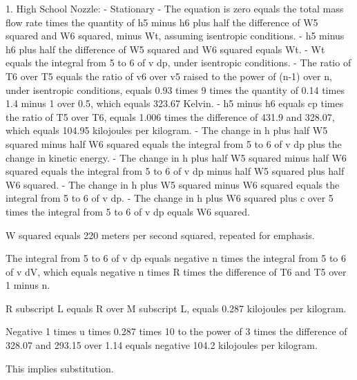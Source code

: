 1. High School Nozzle:
   - Stationary
   - The equation is zero equals the total mass flow rate times the quantity of h5 minus h6 plus half the difference of W5 squared and W6 squared, minus Wt, assuming isentropic conditions.
   - h5 minus h6 plus half the difference of W5 squared and W6 squared equals Wt.
   - Wt equals the integral from 5 to 6 of v dp, under isentropic conditions.
   - The ratio of T6 over T5 equals the ratio of v6 over v5 raised to the power of (n-1) over n, under isentropic conditions, equals 0.93 times 9 times the quantity of 0.14 times 1.4 minus 1 over 0.5, which equals 323.67 Kelvin.
   - h5 minus h6 equals cp times the ratio of T5 over T6, equals 1.006 times the difference of 431.9 and 328.07, which equals 104.95 kilojoules per kilogram.
   - The change in h plus half W5 squared minus half W6 squared equals the integral from 5 to 6 of v dp plus the change in kinetic energy.
   - The change in h plus half W5 squared minus half W6 squared equals the integral from 5 to 6 of v dp minus half W5 squared plus half W6 squared.
   - The change in h plus W5 squared minus W6 squared equals the integral from 5 to 6 of v dp.
   - The change in h plus W6 squared plus c over 5 times the integral from 5 to 6 of v dp equals W6 squared.

W squared equals 220 meters per second squared, repeated for emphasis.

The integral from 5 to 6 of v dp equals negative n times the integral from 5 to 6 of v dV, which equals negative n times R times the difference of T6 and T5 over 1 minus n.

R subscript L equals R over M subscript L, equals 0.287 kilojoules per kilogram.

Negative 1 times u times 0.287 times 10 to the power of 3 times the difference of 328.07 and 293.15 over 1.14 equals negative 104.2 kilojoules per kilogram.

This implies substitution.